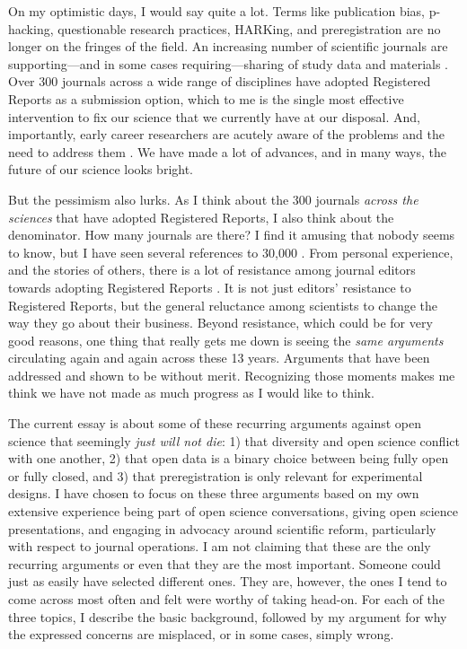\documentclass[authordate, empirical]{jote-new-article}
\begin{document}
On my optimistic days, I would say quite a lot. Terms like publication bias, p-hacking, questionable research practices, HARKing, and preregistration are no longer on the fringes of the field. An increasing number of scientific journals are supporting—and in some cases requiring—sharing of study data and materials \parencites{Kidwell2016}{Nosek2018}. Over 300 journals across a wide range of disciplines have adopted Registered Reports \parencites{Chambers2021} as a submission option, which to me is the single most effective intervention to fix our science that we currently have at our disposal. And, importantly, early career researchers are acutely aware of the problems and the need to address them \parencites{Farnham2017}. We have made a lot of advances, and in many ways, the future of our science looks bright.







But the pessimism also lurks. As I think about the 300 journals \emph{across the sciences} that have adopted Registered Reports, I also think about the denominator. How many journals are there? I find it amusing that nobody seems to know, but I have seen several references to 30,000 \parencites[e.g.,][]{Brembs2018}. From personal experience, and the stories of others, there is a lot of resistance among journal editors towards adopting Registered Reports \parencites[see][]{Chambers2021}. It is not just editors' resistance to Registered Reports, but the general reluctance among scientists to change the way they go about their business. Beyond resistance, which could be for very good reasons, one thing that really gets me down is seeing the \emph{same arguments} circulating again and again across these 13 years. Arguments that have been addressed and shown to be without merit. Recognizing those moments makes me think we have not made as much progress as I would like to think.







The current essay is about some of these recurring arguments against open science that seemingly\emph{ just will not die}: 1) that diversity and open science conflict with one another, 2) that open data is a binary choice between being fully open or fully closed, and 3) that preregistration is only relevant for experimental designs. I have chosen to focus on these three arguments based on my own extensive experience being part of open science conversations, giving open science presentations, and engaging in advocacy around scientific reform, particularly with respect to journal operations. I am not claiming that these are the only recurring arguments or even that they are the most important. Someone could just as easily have selected different ones. They are, however, the ones I tend to come across most often and felt were worthy of taking head-on. For each of the three topics, I describe the basic background, followed by my argument for why the expressed concerns are misplaced, or in some cases, simply wrong.
\end{document}
